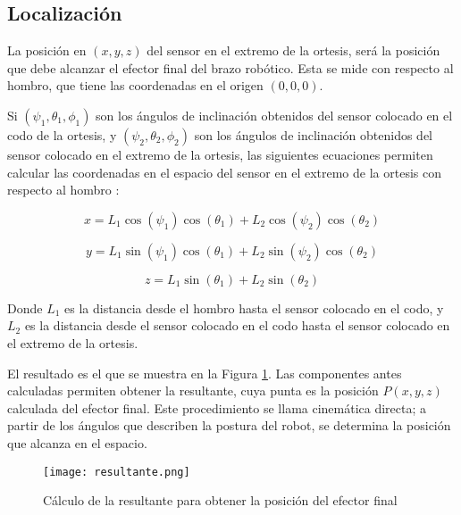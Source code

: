 \subsection{Localización}

La posición en $(x, y, z)$ del sensor en el extremo de la ortesis, será la posición que debe alcanzar el efector final del brazo robótico. Esta se mide con respecto al hombro, que tiene las coordenadas en el origen $(0, 0 ,0)$.

Si $(\psi_{1}, \theta_{1}, \phi_{1})$ son los ángulos de inclinación obtenidos del sensor colocado en el codo de la ortesis, y $(\psi_{2}, \theta_{2}, \phi_{2})$ son los ángulos de inclinación obtenidos del sensor colocado en el extremo de la ortesis, las siguientes ecuaciones permiten calcular las coordenadas en el espacio del sensor en el extremo de la ortesis con respecto al hombro \cite{mathworks2025}:

\begin{equation}
x = L_1 \cos(\psi_1) \cos(\theta_1) + L_2 \cos(\psi_2) \cos(\theta_2)
\end{equation}

\begin{equation}
y = L_1 \sin(\psi_1) \cos(\theta_1) + L_2 \sin(\psi_2) \cos(\theta_2)
\end{equation}

\begin{equation}
z = L_1 \sin(\theta_1) + L_2 \sin(\theta_2)
\end{equation}

Donde $L_1$ es la distancia desde el hombro hasta el sensor colocado en el codo, y $L_2$ es la distancia desde el sensor colocado en el codo hasta el sensor colocado en el extremo de la ortesis.

El resultado es el que se muestra en la Figura \ref{fig:resultante}. Las componentes antes calculadas permiten obtener la resultante, cuya punta es la posición $P(x,y,z)$ calculada del efector final. Este procedimiento se llama cinemática directa; a partir de los ángulos que describen la postura del robot, se determina la posición que alcanza en el espacio.

\begin{figure}[htb]
	\centering
	\texttt{[image: resultante.png]}
	\caption{Cálculo de la resultante para obtener la posición del efector final}
	\label{fig:resultante}
\end{figure}